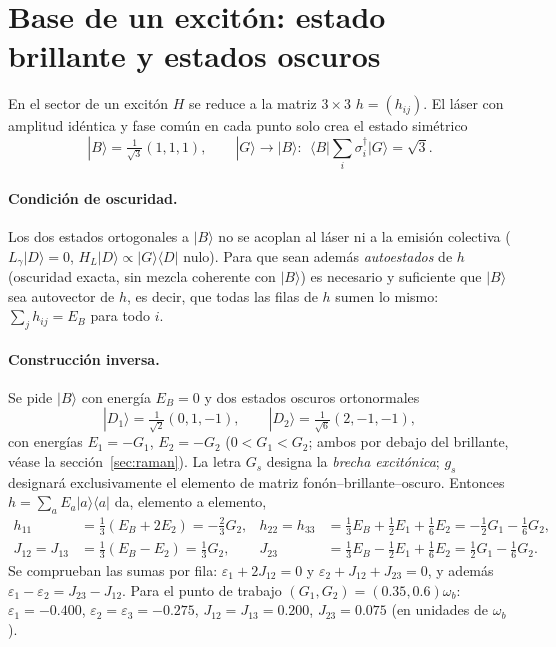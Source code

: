 \documentclass[11pt,a4paper]{article}
\newcommand{\ket}[1]{|#1\rangle}
\newcommand{\bra}[1]{\langle #1|}
\newcommand{\wb}{\omega_b}
\begin{document}
\section{Base de un excitón: estado brillante y estados oscuros}\label{sec:base}
En el sector de un excitón $H$ se reduce a la matriz $3\times3$ $h=(h_{ij})$. El láser con amplitud idéntica y fase común
en cada punto solo crea el estado simétrico
\begin{equation}
\ket{B}=\tfrac1{\sqrt3}(1,1,1),\qquad \ket{G}\to\ket{B}:\ \ \langle B|\textstyle\sum_i\sigma_i^\dagger|G\rangle=\sqrt3 .
\end{equation}
\paragraph{Condición de oscuridad.}
Los dos estados ortogonales a $\ket B$ no se acoplan al láser ni a la emisión colectiva
($L_\gamma\ket{D}=0$, $H_L\ket{D}\propto\ket{G}\!\bra{D}$ nulo). Para que sean además \emph{autoestados} de $h$
(oscuridad exacta, sin mezcla coherente con $\ket B$) es necesario y suficiente que $\ket B$ sea autovector de $h$,
es decir, que todas las filas de $h$ sumen lo mismo: $\sum_j h_{ij}=E_B$ para todo $i$.

\paragraph{Construcción inversa.}
Se pide $\ket B$ con energía $E_B=0$ y dos estados oscuros ortonormales
\begin{equation}
\ket{D_1}=\tfrac1{\sqrt2}(0,1,-1),\qquad \ket{D_2}=\tfrac1{\sqrt6}(2,-1,-1),
\end{equation}
con energías $E_1=-G_1$, $E_2=-G_2$ ($0<G_1<G_2$; ambos por debajo del brillante, véase la sección~\ref{sec:raman}).
La letra $G_s$ designa la \emph{brecha excitónica}; $g_s$ designará exclusivamente el elemento de matriz fonón--brillante--oscuro.
Entonces $h=\sum_aE_a\ket a\!\bra a$ da, elemento a elemento,
\begin{align}
h_{11}&=\tfrac13(E_B+2E_2)=-\tfrac23 G_2, &
h_{22}=h_{33}&=\tfrac13E_B+\tfrac12E_1+\tfrac16E_2=-\tfrac12G_1-\tfrac16G_2,\nonumber\\
J_{12}=J_{13}&=\tfrac13(E_B-E_2)=\tfrac13 G_2, &
J_{23}&=\tfrac13E_B-\tfrac12E_1+\tfrac16E_2=\tfrac12G_1-\tfrac16G_2 . \label{eq:jeps}
\end{align}
Se comprueban las sumas por fila: $\varepsilon_1+2J_{12}=0$ y $\varepsilon_2+J_{12}+J_{23}=0$, y además
$\varepsilon_1-\varepsilon_2=J_{23}-J_{12}$.
Para el punto de trabajo $(G_1,G_2)=(0.35,0.6)\wb$: $\varepsilon_1=-0.400$, $\varepsilon_2=\varepsilon_3=-0.275$,
$J_{12}=J_{13}=0.200$, $J_{23}=0.075$ (en unidades de $\wb$).
\end{document}
